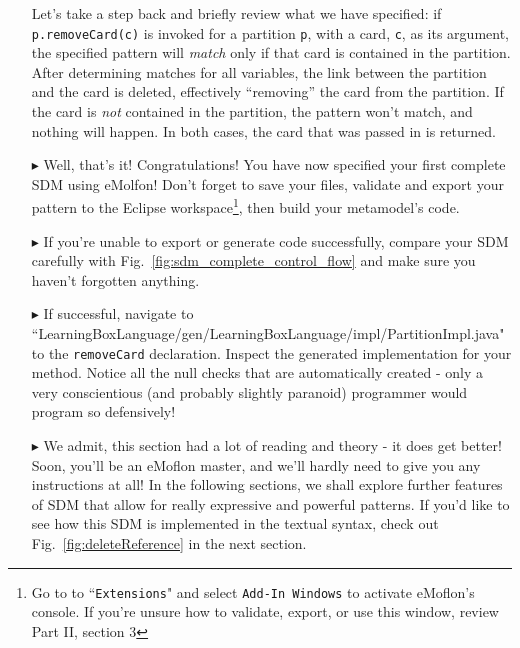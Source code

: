 \begin{itemize}
Let's take a step back and briefly review what we have specified:  if \texttt{p.remove\-Card(c)} is invoked for a partition \texttt{p}, with a card, \texttt{c},
as its argument, the specified pattern will \emph{match} only if that card is contained in the partition. After determining matches for all variables, the
link between the partition and the card is deleted, effectively ``removing'' the card from the partition. If the card is \emph{not} contained in the partition,
the pattern won't match, and nothing will happen. In both cases, the card that was passed in is returned.

\item[$\blacktriangleright$] Well, that's it! Congratulations! You have now specified your first complete SDM using eMolfon! Don't forget to save your
files, validate and export your pattern to the Eclipse workspace\footnote{Go to to ``\texttt{Extensions}" and select \texttt{Add-In Windows} to activate
eMoflon's console. If you're unsure how to validate, export, or use this window, review Part II, section 3}, then build your metamodel's code.

\item[$\blacktriangleright$] If you're unable to export or generate code successfully, compare your SDM carefully with Fig.~\ref{fig:sdm_complete_control_flow}
and make sure you haven't forgotten anything.

\item[$\blacktriangleright$] If successful, navigate to ``Learning\-Box\-Language/\-gen/\-Learning\-Box\-Language/\-impl/\-Partition\-Impl.java" to the
\texttt{\-remove\-Card} declaration. Inspect the generated implementation for your method. Notice all the null checks that are automatically created - only a
very conscientious (and probably slightly paranoid) programmer would program so defensively!

\item[$\blacktriangleright$] We admit, this section had a lot of reading and theory - it does get better! Soon, you'll be an eMoflon master, and we'll hardly
need to give you any instructions at all! In the following sections, we shall explore further features of SDM that allow for really expressive and powerful
patterns. If you'd like to see how this SDM is implemented in the textual syntax, check out Fig.~\ref{fig:deleteReference} in the next section.


\end{itemize}


